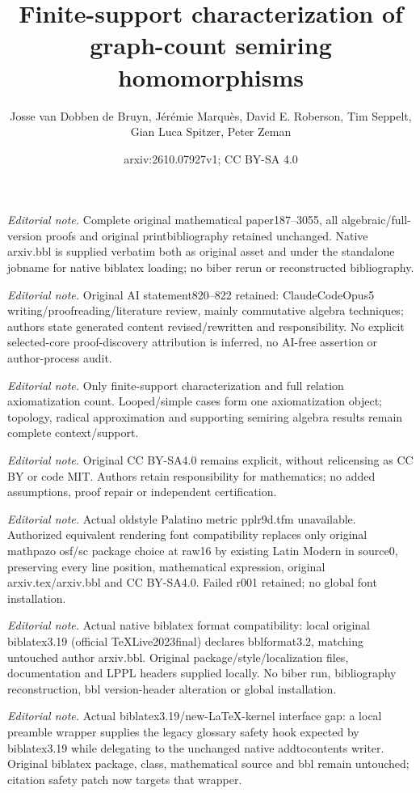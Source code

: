 \documentclass[11pt]{scrartcl}
\title{Finite-support characterization of graph-count semiring homomorphisms}
\author{Josse van Dobben de Bruyn, Jérémie Marquès, David E. Roberson, Tim Seppelt, Gian Luca Spitzer, Peter Zeman}
\date{arxiv:2610.07927v1; CC BY-SA 4.0}
\theoremstyle{definition}
\theoremstyle{plain}
\theoremstyle{remark}
\begin{document}
\maketitle
\noindent\textit{Editorial note.} Complete original mathematical paper187--3055, all algebraic/full-version proofs and original printbibliography retained unchanged. Native arxiv.bbl is supplied verbatim both as original asset and under the standalone jobname for native biblatex loading; no biber rerun or reconstructed bibliography.\par\medskip
\noindent\textit{Editorial note.} Original AI statement820--822 retained: ClaudeCodeOpus5 writing/proofreading/literature review, mainly commutative algebra techniques; authors state generated content revised/rewritten and responsibility. No explicit selected-core proof-discovery attribution is inferred, no AI-free assertion or author-process audit.\par\medskip
\noindent\textit{Editorial note.} Only finite-support characterization and full relation axiomatization count. Looped/simple cases form one axiomatization object; topology, radical approximation and supporting semiring algebra results remain complete context/support.\par\medskip
\noindent\textit{Editorial note.} Original CC BY-SA4.0 remains explicit, without relicensing as CC BY or code MIT. Authors retain responsibility for mathematics; no added assumptions, proof repair or independent certification.\par\medskip
\noindent\textit{Editorial note.} Actual oldstyle Palatino metric pplr9d.tfm unavailable. Authorized equivalent rendering font compatibility replaces only original mathpazo osf/sc package choice at raw16 by existing Latin Modern in source0, preserving every line position, mathematical expression, original arxiv.tex/arxiv.bbl and CC BY-SA4.0. Failed r001 retained; no global font installation.\par\medskip
\noindent\textit{Editorial note.} Actual native biblatex format compatibility: local original biblatex3.19 (official TeXLive2023final) declares bblformat3.2, matching untouched author arxiv.bbl. Original package/style/localization files, documentation and LPPL headers supplied locally. No biber run, bibliography reconstruction, bbl version-header alteration or global installation.\par\medskip
\noindent\textit{Editorial note.} Actual biblatex3.19/new-LaTeX-kernel interface gap: a local preamble wrapper supplies the legacy glossary safety hook expected by biblatex3.19 while delegating to the unchanged native addtocontents writer. Original biblatex package, class, mathematical source and bbl remain untouched; citation safety patch now targets that wrapper.\par\medskip
\end{document}
